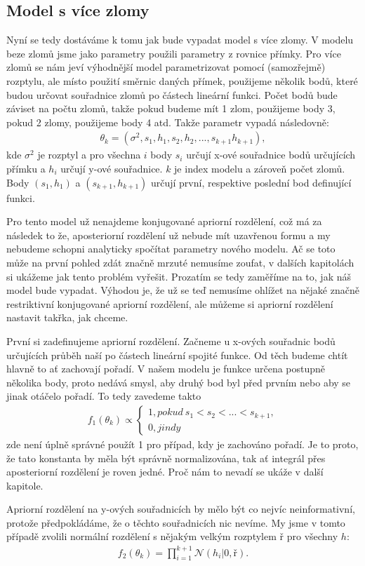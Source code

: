 \documentclass[czech,master,public,dept470,male,cpdeclaration,oneside, python]{diploma}
\begin{document}
\subsection{Model s více zlomy}
Nyní se tedy dostáváme k tomu jak bude vypadat model s více zlomy. V modelu beze zlomů jsme jako parametry použili parametry z rovnice přímky. Pro více zlomů se nám jeví výhodnější model parametrizovat pomocí (samozřejmě) rozptylu, ale místo použití směrnic daných přímek, použijeme několik bodů, které budou určovat souřadnice zlomů po částech lineární funkci.  Počet bodů bude záviset na počtu zlomů, takže pokud budeme mít 1 zlom, použijeme body 3, pokud 2 zlomy, použijeme body 4 atd. Takže parametr vypadá následovně:
\begin{align}
\theta_k = (\sigma^2, s_1, h_1, s_2, h_2, ..., s_{k+1} h_{k+1}),
\end{align}
kde $\sigma^2$ je rozptyl a pro všechna $i$ body $s_i$ určují x-ové souřadnice bodů určujících přímku a $h_i$ určují y-ové souřadnice. $k$ je index modelu a zároveň počet zlomů. Body $(s_1, h_1)$ a $(s_{k+1}, h_{k+1})$ určují první, respektive poslední bod definující funkci.\par
Pro tento model už nenajdeme konjugované apriorní rozdělení, což má za následek to že, aposteriorní rozdělení už nebude mít uzavřenou formu a my nebudeme schopni analyticky spočítat parametry nového modelu. Ač se toto může na první pohled zdát značně mrzuté nemusíme zoufat, v dalších kapitolách si ukážeme jak tento problém vyřešit. Prozatím se tedy zaměříme na to, jak náš model bude vypadat. Výhodou je, že už se teď nemusíme ohlížet na nějaké značně restriktivní konjugované apriorní rozdělení, ale můžeme si apriorní rozdělení nastavit takřka, jak chceme.\par
První si zadefinujeme apriorní rozdělení. Začneme u x-ových souřadnic bodů určujících průběh naší po částech lineární spojité funkce. Od těch budeme chtít hlavně to ať zachovají pořadí. V našem modelu je funkce určena postupně několika body, proto nedává smysl, aby druhý bod byl před prvním nebo aby se jinak otáčelo pořadí. To tedy zavedeme takto
\begin{align}
f_1(\theta_k) \propto
	\begin{cases}
		1, pokud\ s_1 < s_2 < ... < s_{k+1}, \\
		0, jindy		
	\end{cases}
\end{align}
zde není úplně správné použít 1 pro případ, kdy je zachováno pořadí. Je to proto, že tato konstanta by měla být správně normalizována, tak ať integrál přes aposteriorní rozdělení je roven jedné. Proč nám to nevadí se ukáže v další kapitole. \par
Apriorní rozdělení na y-ových souřadnicích by mělo být co nejvíc neinformativní, protože předpokládáme, že o těchto souřadnicích nic nevíme. My jsme v tomto případě zvolili normální rozdělení s nějakým velkým rozptylem $ř$ pro všechny $h$:
\begin{align}
f_2(\theta_k) = \prod_{i=1}^{k+1} \mathcal{N}(h_i | 0, ř).
\end{align}
\end{document}
